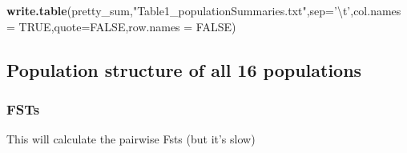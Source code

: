 \documentclass[]{article}
\newenvironment{Shaded}{\begin{snugshade}}{\end{snugshade}}
\newcommand{\KeywordTok}[1]{\textcolor[rgb]{0.13,0.29,0.53}{\textbf{#1}}}
\newcommand{\DataTypeTok}[1]{\textcolor[rgb]{0.13,0.29,0.53}{#1}}
\newcommand{\CharTok}[1]{\textcolor[rgb]{0.31,0.60,0.02}{#1}}
\newcommand{\StringTok}[1]{\textcolor[rgb]{0.31,0.60,0.02}{#1}}
\newcommand{\OtherTok}[1]{\textcolor[rgb]{0.56,0.35,0.01}{#1}}
\newcommand{\NormalTok}[1]{#1}
\begin{document}
\begin{Shaded}
\begin{Highlighting}[]
\KeywordTok{write.table}\NormalTok{(pretty_sum,}\StringTok{"Table1_populationSummaries.txt"}\NormalTok{,}\DataTypeTok{sep=}\StringTok{'}\CharTok{\textbackslash{}t}\StringTok{'}\NormalTok{,}\DataTypeTok{col.names =} \OtherTok{TRUE}\NormalTok{,}\DataTypeTok{quote=}\OtherTok{FALSE}\NormalTok{,}\DataTypeTok{row.names =} \OtherTok{FALSE}\NormalTok{)}
\end{Highlighting}
\end{Shaded}

\subsection{Population structure of all 16
populations}\label{population-structure-of-all-16-populations}

\subsubsection{FSTs}\label{fsts}

This will calculate the pairwise Fsts (but it's slow)
\end{document}

